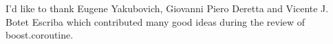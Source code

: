 
I'd like to thank Eugene Yakubovich, Giovanni Piero Deretta and Vicente J.
Botet Escriba which contributed many good ideas during the review of
boost.coroutine. 
